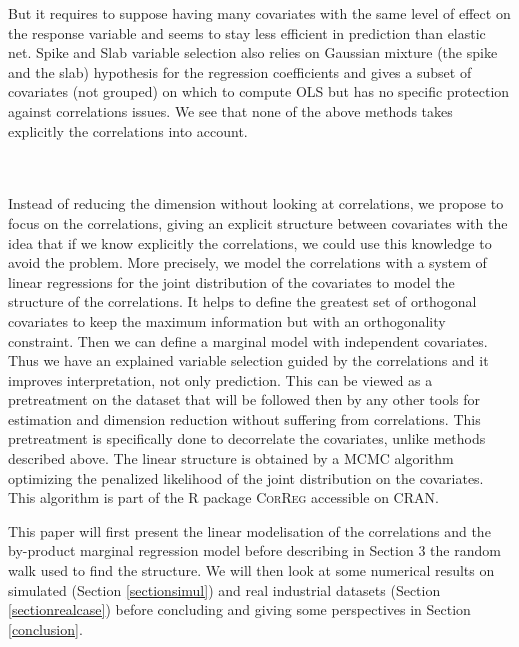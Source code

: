 \documentclass[11pt,a4paper]{article}
\begin{document}
	But it requires to suppose having many covariates with the same level of effect on the response variable and seems to stay less efficient in prediction than elastic net. Spike and Slab variable selection \cite{ishwaran2005spike} also relies on Gaussian mixture (the spike and the slab) hypothesis for the regression coefficients and gives a subset of covariates (not grouped) on which to compute \textsc{OLS} but has no specific protection against correlations issues.
	We see that none of the above methods takes explicitly the correlations into account.

	~\\	~\\

 Instead of reducing the dimension without looking at correlations,  we propose to focus on the correlations, giving an explicit structure between covariates with the idea that if we know explicitly the correlations, we could use this knowledge to avoid the problem. More precisely, we model the correlations with a system of linear regressions for the joint distribution of the covariates to model the structure of the correlations. It helps to define the greatest set of orthogonal covariates to keep the maximum information but with an orthogonality constraint.
Then we can define a marginal model with independent covariates. 
Thus we have an explained variable selection guided by the correlations and it improves interpretation, not only prediction.
 This can be viewed as a pretreatment on the dataset that will be followed then by any other tools for estimation and dimension reduction without suffering from correlations. This pretreatment is specifically done to decorrelate the covariates, unlike methods described above. 
The linear structure is obtained by a MCMC algorithm optimizing the penalized likelihood of the joint distribution on the covariates. This algorithm is part of the R package \textsc{CorReg} accessible on \textsc{CRAN}. %
 
	
 	
 	This paper will first present the linear modelisation of the correlations and the by-product marginal regression model before describing in Section 3 the random walk used to find the structure.
 	We will then look at some numerical results on simulated (Section \ref{sectionsimul}) and real industrial datasets (Section \ref{sectionrealcase}) before concluding and giving some perspectives in Section \ref{conclusion}.
	
\end{document}
